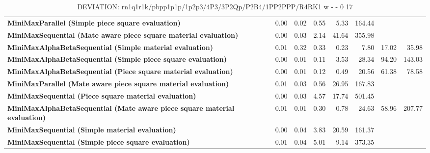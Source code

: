 \begin{table}[H]
{\begin{tabular}{|p{8cm}|*{7}{r|}}
\rowcolor[HTML]{FFFFFF}
\textbf{MiniMaxParallel (Simple piece square evaluation)}               & 0.00 & 0.02 & 0.55 & 5.33 & 164.44 &  &  \\

\rowcolor[HTML]{EFEFEF}
\textbf{MiniMaxSequential (Mate aware piece square material evaluation)}               & 0.00 & 0.03 & 2.14 & 41.64 & 355.98 &  &  \\

\rowcolor[HTML]{FFFFFF}
\textbf{MiniMaxAlphaBetaSequential (Simple material evaluation)}               & 0.01 & 0.32 & 0.33 & 0.23 & 7.80 & 17.02 & 35.98 \\

\rowcolor[HTML]{EFEFEF}
\textbf{MiniMaxAlphaBetaSequential (Simple piece square evaluation)}               & 0.00 & 0.01 & 0.11 & 3.53 & 28.34 & 94.20 & 143.03 \\

\rowcolor[HTML]{FFFFFF}
\textbf{MiniMaxAlphaBetaSequential (Piece square material evaluation)}               & 0.00 & 0.01 & 0.12 & 0.49 & 20.56 & 61.38 & 78.58 \\

\rowcolor[HTML]{EFEFEF}
\textbf{MiniMaxParallel (Mate aware piece square material evaluation)}               & 0.01 & 0.03 & 0.56 & 26.95 & 167.83 &  &  \\

\rowcolor[HTML]{FFFFFF}
\textbf{MiniMaxSequential (Piece square material evaluation)}               & 0.00 & 0.03 & 4.57 & 17.74 & 501.45 &  &  \\

\rowcolor[HTML]{EFEFEF}
\textbf{MiniMaxAlphaBetaSequential (Mate aware piece square material evaluation)}               & 0.01 & 0.01 & 0.30 & 0.78 & 24.63 & 58.96 & 207.77 \\

\rowcolor[HTML]{FFFFFF}
\textbf{MiniMaxSequential (Simple material evaluation)}               & 0.00 & 0.04 & 3.83 & 20.59 & 161.37 &  &  \\

\rowcolor[HTML]{EFEFEF}
\textbf{MiniMaxSequential (Simple piece square evaluation)}               & 0.01 & 0.04 & 5.01 & 9.14 & 373.35 &  &  \\

            \hline
        \end{tabular}%
    }
    \caption{DEVIATION: rn1q1r1k/pbpp1p1p/1p2p3/4P3/3P2Qp/P2B4/1PP2PPP/R4RK1 w - - 0 17}
    \label{tab:mid-game---en-passant---long-deviation}
\end{table}
